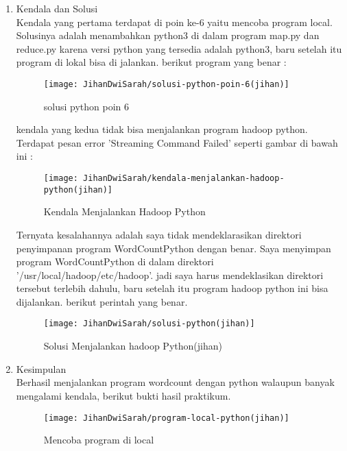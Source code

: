 \begin{enumerate}
\item Kendala dan Solusi \\
Kendala yang  pertama terdapat di poin ke-6 yaitu mencoba program local. Solusinya adalah menambahkan python3 di dalam program map.py dan reduce.py karena versi python yang tersedia adalah python3, baru setelah itu program di lokal bisa di jalankan. berikut program yang benar : \\
\begin{figure}[!ht]
\texttt{[image: JihanDwiSarah/solusi-python-poin-6(jihan)]}
\caption{solusi python poin 6}
\label{gam:solusi-python-poin-6(jihan)}
\end{figure} 

kendala yang kedua tidak bisa menjalankan program hadoop python. Terdapat pesan error 'Streaming Command Failed' seperti gambar di bawah ini :
\begin{figure}[!ht]
\texttt{[image: JihanDwiSarah/kendala-menjalankan-hadoop-python(jihan)]}
\caption{Kendala Menjalankan Hadoop Python}
\label{gam:kendala-menjalankan-hadoop-python(jihan)}
\end{figure} 

Ternyata kesalahannya adalah saya tidak mendeklarasikan direktori penyimpanan program WordCountPython dengan benar. Saya menyimpan program WordCountPython di dalam direktori '/usr/local/hadoop/etc/hadoop'. jadi saya harus mendeklasikan direktori tersebut terlebih dahulu, baru setelah itu program hadoop python ini bisa dijalankan. berikut perintah yang benar.
\begin{figure}[!ht]
\texttt{[image: JihanDwiSarah/solusi-python(jihan)]}
\caption{Solusi Menjalankan hadoop Python(jihan)}
\label{gam:solusi-python(jihan)}
\end{figure} 

\item Kesimpulan\\
Berhasil menjalankan program wordcount dengan python walaupun banyak mengalami kendala, berikut bukti hasil praktikum. 

\begin{figure}[!ht]
\texttt{[image: JihanDwiSarah/program-local-python(jihan)]}
\caption{Mencoba program di local}
\label{gam:program-local-python(jihan)}
\end{figure} 


\end{enumerate}
